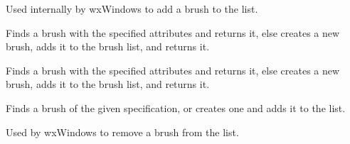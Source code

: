 \label{wxbrushlistaddbrush}


Used internally by wxWindows to add a brush to the list.

\label{wxbrushlistfindorcreatebrush}


Finds a brush with the specified attributes and returns it, else creates a new brush, adds it
to the brush list, and returns it.


Finds a brush with the specified attributes and returns it, else creates a new brush, adds it
to the brush list, and returns it.

Finds a brush of the given specification, or creates one and adds it to the list.





\label{wxbrushlistremovebrush}


Used by wxWindows to remove a brush from the list.


